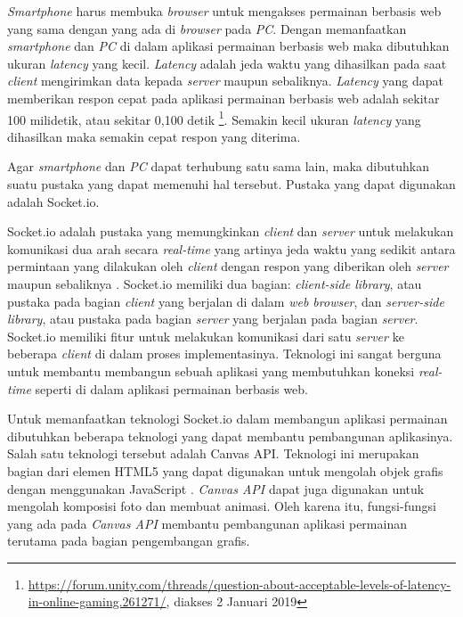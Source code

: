 \textit{Smartphone} harus membuka \textit{browser} untuk mengakses permainan berbasis web yang sama dengan yang ada di \textit{browser} pada \textit{PC}. Dengan memanfaatkan \textit{smartphone} dan \textit{PC} di dalam aplikasi permainan berbasis web maka dibutuhkan ukuran \textit{latency} yang kecil. \textit{Latency} adalah jeda waktu yang dihasilkan pada saat \textit{client} mengirimkan data kepada \textit{server} maupun sebaliknya. \textit{Latency} yang dapat memberikan respon cepat pada aplikasi permainan berbasis web adalah sekitar 100 milidetik, atau sekitar 0,100 detik \footnote{\url{https://forum.unity.com/threads/question-about-acceptable-levels-of-latency-in-online-gaming.261271/}, diakses 2 Januari 2019}. Semakin kecil ukuran \textit{latency} yang dihasilkan maka semakin cepat respon yang diterima.

Agar \textit{smartphone} dan \textit{PC} dapat terhubung satu sama lain, maka dibutuhkan suatu pustaka yang dapat memenuhi hal tersebut. Pustaka yang dapat digunakan adalah Socket.io.

Socket.io adalah pustaka yang memungkinkan \textit{client} dan \textit{server} untuk melakukan komunikasi dua arah secara \textit{real-time} yang artinya jeda waktu yang sedikit antara permintaan yang dilakukan oleh \textit{client} dengan respon yang diberikan oleh \textit{server} maupun sebaliknya  \cite{damien:11:socketiodocs}. Socket.io memiliki dua bagian: \textit{client-side library}, atau pustaka pada bagian \textit{client} yang berjalan di dalam \textit{web browser}, dan \textit{server-side library}, atau pustaka pada bagian \textit{server} yang berjalan pada bagian \textit{server}. Socket.io memiliki fitur untuk melakukan komunikasi dari satu \textit{server} ke beberapa \textit{client} di dalam proses implementasinya. Teknologi ini sangat berguna untuk membantu membangun sebuah aplikasi yang membutuhkan koneksi \textit{real-time} seperti di dalam aplikasi permainan berbasis web.

Untuk memanfaatkan teknologi Socket.io dalam membangun aplikasi permainan dibutuhkan beberapa teknologi yang dapat membantu pembangunan aplikasinya. Salah satu teknologi tersebut adalah Canvas API. Teknologi ini merupakan bagian dari elemen HTML5 yang dapat digunakan untuk mengolah objek grafis dengan menggunakan JavaScript \cite{moz:04:canvasapi}. \textit{Canvas API} dapat juga digunakan untuk mengolah komposisi foto dan membuat animasi. Oleh karena itu, fungsi-fungsi yang ada pada \textit{Canvas API} membantu pembangunan aplikasi permainan terutama pada bagian pengembangan grafis.

